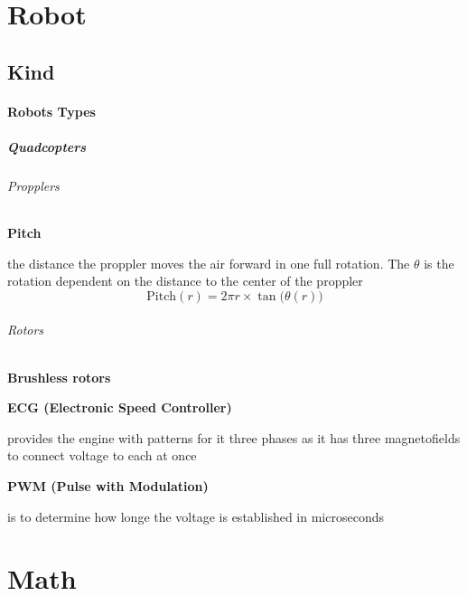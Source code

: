 \documentclass{book}
\providecommand{\ProjectDeepHeading}[2]{%
    \par\medskip\noindent\textbf{#2}\par\smallskip
}
\providecommand{\ProjectSafeIncludePdf}[2][]{}
\begin{document}

\tableofcontents
\cite{busoniu-2008-a-comprehensive-survey-of-multi-agent-reinforcement-learning}












\listoftodos


\chapter{Robot}

\section{Kind}


\subsubsection{Robots Types}
\paragraph{Quadcopters}
    \subparagraph{Propplers}
        \ProjectDeepHeading{2}{Pitch}
            the distance the proppler moves the air forward in one full rotation.
            The \ensuremath{\theta} is the rotation dependent on the distance to the center of the proppler
            \[
            \text{Pitch}(r) = 2\ensuremath{\pi} r \times \tan\big(\ensuremath{\theta}(r)\big)
            \]
    \subparagraph{Rotors}
        \ProjectSafeIncludePdf[pages=-]{../assets/rotor.pdf}
        \ProjectDeepHeading{1}{Brushless rotors}
            \ProjectDeepHeading{2}{ECG (Electronic Speed Controller)}
                provides the engine with patterns for it three phases as it has three magnetofields to connect voltage to each at once
            \ProjectDeepHeading{2}{PWM (Pulse with Modulation)}
                is to determine how longe the voltage is established in microseconds

\chapter{Math}
\end{document}
